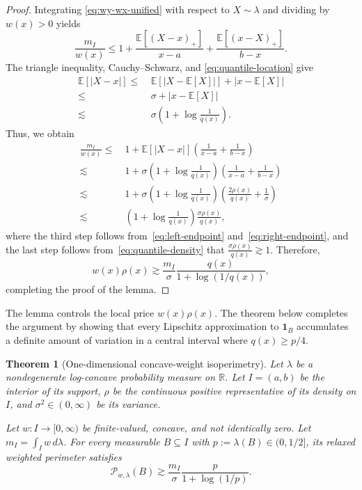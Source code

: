 \documentclass[11pt]{article}
\newtheorem{theorem}{Theorem}[section]
\theoremstyle{definition}
\theoremstyle{remark}
\newcommand{\E}{\mathbb E}
\newcommand{\R}{\mathbb R}
\newcommand{\cP}{\mathcal P}
\newcommand{\one}{\mathbf 1}
\begin{document}
\begin{proof}
Integrating \eqref{eq:wy-wx-unified} with respect to $X\sim\lambda$ and
dividing by $w(x)>0$ yields
\begin{equation}\label{eq:mean-vs-point}
 \frac{m_I}{w(x)}
 \le
 1+\frac{\E[(X-x)_+]}{x-a}
   +\frac{\E[(x-X)_+]}{b-x}.
\end{equation}
The triangle inequality, Cauchy--Schwarz, and
\eqref{eq:quantile-location} give
\begin{equation}\label{eq:first-moment-at-quantile}
\begin{aligned}
 \E[|X-x|]\le &~ \E[|X-\E [X]|]+|x-\E [X]|\\
 \leq &~ \sigma + |x-\E [X]|\\
 \lesssim &~  \sigma\left(1+\log\frac{1}{q(x)}\right).
\end{aligned}
\end{equation}
Thus, we obtain
\begin{align*}
 \frac{m_I}{w(x)} \leq &~ 1+\E\left[|X-x|\right]\left(\frac{1}{x-a}+\frac{1}{b-x}\right)\\
 \lesssim &~ 1 + \sigma\left(1+\log\frac{1}{q(x)}\right) \left(\frac{1}{x-a}+\frac{1}{b-x}\right)\\
 \lesssim &~ 1 + \sigma\left(1+\log\frac{1}{q(x)}\right)\left(\frac{2\rho(x)}{q(x)}+\frac{1}{\sigma}\right) \\
 \lesssim &~ \left(1+\log\frac{1}{q(x)}\right)
 \frac{\sigma\rho(x)}{q(x)},
\end{align*}
where the third step follows from~\eqref{eq:left-endpoint} and~\eqref{eq:right-endpoint}, and the last step follows from~\eqref{eq:quantile-density} that $\frac{\sigma \rho(x)}{q(x)}\gtrsim 1$. Therefore,
\begin{equation*}
 w(x)\rho(x)
 \gtrsim
 \frac{m_I}{\sigma}
 \frac{q(x)}{1+\log(1/q(x))},
\end{equation*}
completing the proof of the lemma.
\end{proof}

The lemma controls the local price $w(x)\rho(x)$.  The theorem below completes the argument by showing that every Lipschitz approximation to $\one_B$ accumulates a definite amount of variation in a central interval where $q(x)\ge p/4$.

\begin{theorem}[One-dimensional concave-weight isoperimetry]\label{thm:one-dimensional}
Let $\lambda$ be a nondegenerate log-concave probability measure on $\R$. Let $I=(a,b)$ be the interior of its support, $\rho$ be the continuous positive representative of its density on $I$, and  $\sigma^2\in(0,\infty)$ be its variance. 

Let $w:I\to[0,\infty)$ be finite-valued, concave, and not identically zero. Let $m_I=\int_I w\,d\lambda$. For every measurable $B\subseteq I$ with
$p:=\lambda(B)\in (0, 1/2]$, its relaxed weighted perimeter satisfies
\begin{equation}\label{eq:one-dimensional}
 \cP_{w,\lambda}(B)
 \gtrsim
 \frac{m_I}{\sigma}
 \frac{p}{1+\log(1/p)}.
\end{equation}
\end{theorem}
\end{document}
